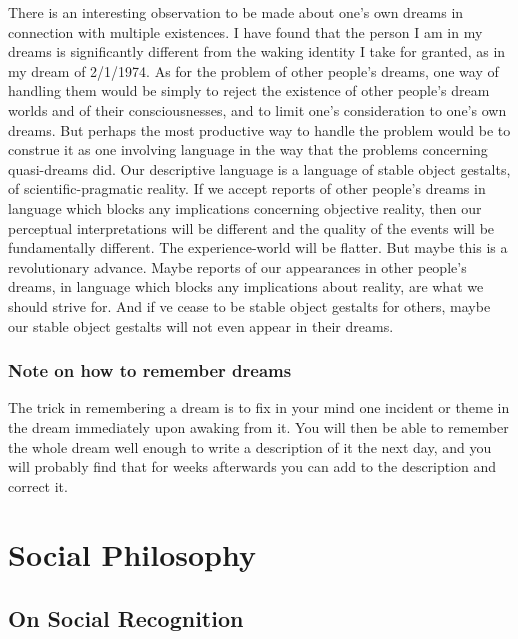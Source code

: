 \documentclass[10pt,twoside,draft]{memoir}
\begin{document}
{{{There is an interesting observation to be made about one's own dreams 
in connection with multiple existences. I have found that the person I am in 
my dreams is significantly different from the waking identity I take for 
granted, as in my dream of 2/1/1974. As for the problem of other people's 
dreams, one way of handling them would be simply to reject the existence of 
other people's dream worlds and of their consciousnesses, and to limit one's 
consideration to one's own dreams. But perhaps the most productive way to 
handle the problem would be to construe it as one involving language in the 
way that the problems concerning quasi-dreams did. Our descriptive language 
is a language of stable object gestalts, of scientific-pragmatic reality. If we 
accept reports of other people's dreams in language which blocks any 
implications concerning objective reality, then our perceptual interpretations 
will be different and the quality of the events will be fundamentally 
different. The experience-world will be flatter. But maybe this is a 
revolutionary advance. Maybe reports of our appearances in other people's 
dreams, in language which blocks any implications about reality, are what we 
should strive for. And if ve cease to be stable object gestalts for others, 
maybe our stable object gestalts will not even appear in their dreams. 


\section*{Note on how to remember dreams}

The trick in remembering a dream is to fix in your mind one incident or 
theme in the dream immediately upon awaking from it. You will then be 
able to remember the whole dream well enough to write a description of it 
the next day, and you will probably find that for weeks afterwards you can 
add to the description and correct it. 


\part{Social Philosophy}

\chapter{On Social Recognition}

}}}
\end{document}
